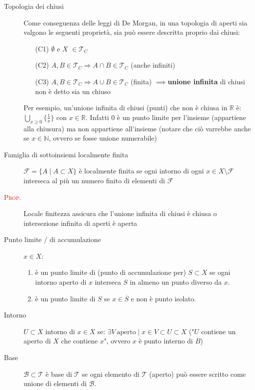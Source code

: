 \documentclass[a4paper,10pt]{article}
\newcommand{\myth}{\normalfont \scshape \textcolor{red}}
\theoremstyle{remark}
\theoremstyle{definition}
\begin{document}
\begin{description}
     \item[Topologia dei chiusi] Come conseguenza delle leggi di De Morgan, in una topologia di aperti sia valgono le seguenti proprietà, sia può essere descritta proprio dai chiusi:
    \begin{itemize}
        \item[(C1)] $\emptyset$ e $X$ $\in \mathcal{T}_C$
        \item[(C2)] $A, B \in \mathcal{T}_C \Rightarrow A \cap B \in \mathcal{T}_C $ (anche infiniti)
        \item[(C3)] $A, B \in \mathcal{T}_C \Rightarrow A \cup B \in \mathcal{T}_C $ (finita) $\implies$\textbf{unione infinita} di chiusi non è detto sia un chiuso
    \end{itemize}
    Per esempio, un'unione infinita di chiusi (punti) che non è chiusa in $\mathbb{R}$ è: $\bigcup_{x \ge 0}\{\frac{1}{x}\}$ con $x \in \mathbb{R}$. Infatti 0 è un punto limite per l'insieme (appartiene alla chiusura) ma non appartiene all'insieme (notare che ciò varrebbe anche se $x \in \mathbb{N}$, ovvero se fosse unione numerabile)
    \item[Famiglia di sottoinsiemi localmente finita] $\mathcal{F}=\{A \mid A \subset X\}$ è localmente finita se ogni intorno di ogni $x\in X \setminus\mathcal{F}$ interseca al più un numero finito di elementi di $\mathcal{F}$
    \item[\myth{Prop.}] Locale finitezza assicura che l'unione infinita di chiusi è chiusa o intersezione infinita di aperti è aperta 
    \item[Punto limite / di accumulazione] $x \in  X$:
    \begin{enumerate}
        \item è un punto limite di (punto di accumulazione per) $S \subset X$ se ogni intorno aperto di $x$ interseca $S$ in almeno un punto diverso da $x$.
        \item  è un punto limite di $S$ se $x \in \overline{S}$ e non è punto isolato.
    \end{enumerate}

    \item[Intorno] $U \subset X$ intorno di $x \in X$ se: $\exists V \ \mbox{aperto} \mid x \in V \subset U \subset X$ ("$U$ contiene un aperto di $X$ che contiene $x$", ovvero $x$ è punto interno di $B$)

    \item[Base] $\mathcal{B} \subset \mathcal{T}$ è base di $\mathcal{T}$ se ogni elemento di $\mathcal{T}$ (aperto) può essere scritto come unione di elementi di $\mathcal{B}$.
    

\end{description}
\end{document}
